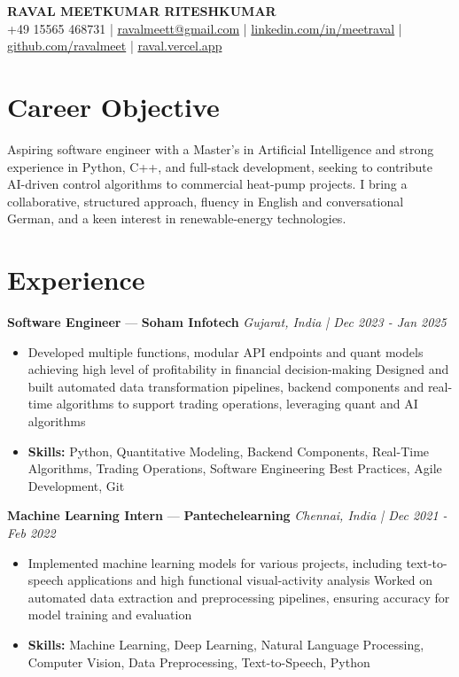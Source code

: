 \documentclass[a4paper,10pt]{article}
\begin{document}
\begin{center}
  {\Large\bfseries RAVAL MEETKUMAR RITESHKUMAR}\\[2pt]
  {\small +49 15565 468731 \;|\; \href{mailto:ravalmeett@gmail.com}{ravalmeett@gmail.com} \;|\; \href{https://www.linkedin.com/in/meetraval/}{linkedin.com/in/meetraval} \;|\; \href{https://github.com/ravalmeet}{github.com/ravalmeet} \;|\; \href{https://raval.vercel.app/}{raval.vercel.app}}
\end{center}
\vspace{-3pt}

\section*{Career Objective}
Aspiring software engineer with a Master's in Artificial Intelligence and strong experience in Python, C++, and full-stack development, seeking to contribute AI-driven control algorithms to commercial heat-pump projects. I bring a collaborative, structured approach, fluency in English and conversational German, and a keen interest in renewable-energy technologies.\par

\section*{Experience}
\textbf{Software Engineer} — \textbf{Soham Infotech} \hfill \textit{Gujarat, India \;|\; Dec 2023 - Jan 2025}\par
\vspace{1pt}
\begin{itemize}
  \item Developed multiple functions, modular API endpoints and quant models achieving high level of profitability in financial decision-making Designed and built automated data transformation pipelines, backend components and real-time algorithms to support trading operations, leveraging quant and AI algorithms
  \item \textbf{Skills:} Python, Quantitative Modeling, Backend Components, Real-Time Algorithms, Trading Operations, Software Engineering Best Practices, Agile Development, Git
\end{itemize}
\vspace{3pt}
\textbf{Machine Learning Intern} — \textbf{Pantechelearning} \hfill \textit{Chennai, India \;|\; Dec 2021 - Feb 2022}\par
\vspace{1pt}
\begin{itemize}
  \item Implemented machine learning models for various projects, including text-to-speech applications and high functional visual-activity analysis Worked on automated data extraction and preprocessing pipelines, ensuring accuracy for model training and evaluation
  \item \textbf{Skills:} Machine Learning, Deep Learning, Natural Language Processing, Computer Vision, Data Preprocessing, Text-to-Speech, Python
\end{itemize}
\end{document}
